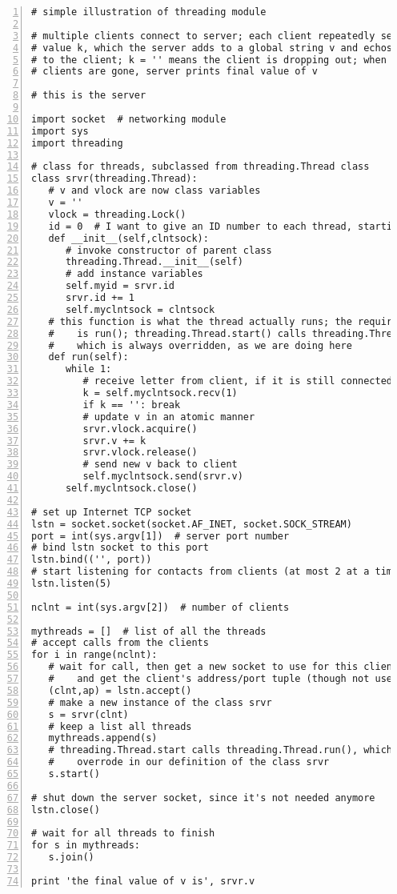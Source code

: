 \begin{Verbatim}[fontsize=\relsize{-2},numbers=left]
# simple illustration of threading module

# multiple clients connect to server; each client repeatedly sends a
# value k, which the server adds to a global string v and echos back
# to the client; k = '' means the client is dropping out; when all
# clients are gone, server prints final value of v

# this is the server

import socket  # networking module
import sys
import threading 

# class for threads, subclassed from threading.Thread class 
class srvr(threading.Thread):
   # v and vlock are now class variables
   v = ''
   vlock = threading.Lock()
   id = 0  # I want to give an ID number to each thread, starting at 0
   def __init__(self,clntsock):
      # invoke constructor of parent class
      threading.Thread.__init__(self)
      # add instance variables
      self.myid = srvr.id
      srvr.id += 1
      self.myclntsock = clntsock 
   # this function is what the thread actually runs; the required name
   #    is run(); threading.Thread.start() calls threading.Thread.run(),
   #    which is always overridden, as we are doing here
   def run(self):
      while 1:
         # receive letter from client, if it is still connected
         k = self.myclntsock.recv(1)
         if k == '': break
         # update v in an atomic manner
         srvr.vlock.acquire()
         srvr.v += k
         srvr.vlock.release()
         # send new v back to client
         self.myclntsock.send(srvr.v)
      self.myclntsock.close()

# set up Internet TCP socket
lstn = socket.socket(socket.AF_INET, socket.SOCK_STREAM)
port = int(sys.argv[1])  # server port number
# bind lstn socket to this port 
lstn.bind(('', port))
# start listening for contacts from clients (at most 2 at a time)
lstn.listen(5)

nclnt = int(sys.argv[2])  # number of clients

mythreads = []  # list of all the threads
# accept calls from the clients
for i in range(nclnt):
   # wait for call, then get a new socket to use for this client,
   #    and get the client's address/port tuple (though not used)
   (clnt,ap) = lstn.accept()
   # make a new instance of the class srvr 
   s = srvr(clnt)
   # keep a list all threads
   mythreads.append(s)
   # threading.Thread.start calls threading.Thread.run(), which we
   #    overrode in our definition of the class srvr
   s.start()

# shut down the server socket, since it's not needed anymore 
lstn.close()

# wait for all threads to finish 
for s in mythreads:
   s.join()

print 'the final value of v is', srvr.v
\end{Verbatim}

